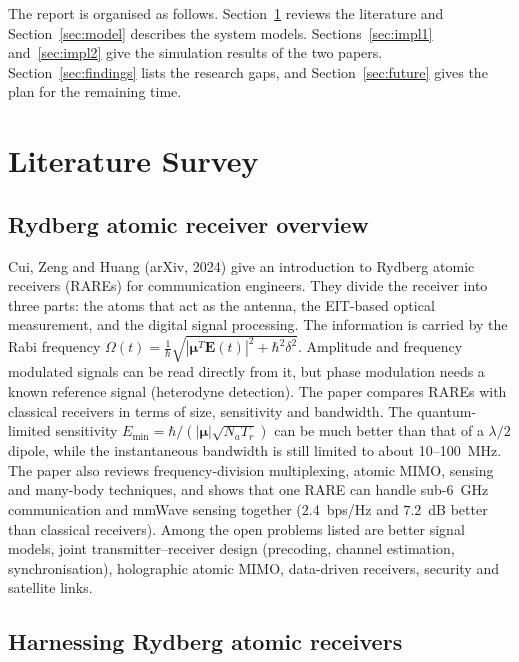 \documentclass[11pt,a4paper]{article}
\begin{document}
The report is organised as follows. Section~\ref{sec:lit} reviews the literature and
Section~\ref{sec:model} describes the system models. Sections~\ref{sec:impl1}
and~\ref{sec:impl2} give the simulation results of the two papers. Section~\ref{sec:findings}
lists the research gaps, and Section~\ref{sec:future} gives the plan
for the remaining time.


\section{Literature Survey}
\label{sec:lit}

\subsection{\texorpdfstring{Rydberg atomic receiver overview~\cite{cui2026rare}}{Rydberg atomic receiver overview}}

Cui, Zeng and Huang (arXiv, 2024) give an introduction to Rydberg atomic
receivers (RAREs) for communication engineers. They divide the receiver into three parts:
the atoms that act as the antenna, the EIT-based optical measurement, and the digital signal
processing. The information is carried by the Rabi frequency
$\Omega(t)=\frac{1}{\hbar}\sqrt{|\boldsymbol{\mu}^T\mathbf{E}(t)|^2+\hbar^2\delta^2}$. Amplitude
and frequency modulated signals can be read directly from it, but phase modulation needs a
known reference signal (heterodyne detection). The paper compares RAREs with classical
receivers in terms of size, sensitivity and bandwidth. The quantum-limited sensitivity
$E_{\min}=\hbar/(|\boldsymbol\mu|\sqrt{N_aT_r})$ can be much better than that of a $\lambda/2$
dipole, while the instantaneous bandwidth is still limited to about 10--100~MHz. The paper
also reviews frequency-division multiplexing, atomic MIMO, sensing and many-body techniques,
and shows that one RARE can handle sub-6~GHz communication and mmWave sensing together
($2.4$~bps/Hz and $7.2$~dB better than classical receivers). Among the open problems listed
are better signal models, joint transmitter--receiver design (precoding, channel estimation,
synchronisation), holographic atomic MIMO, data-driven receivers, security and satellite links.

\subsection{\texorpdfstring{Harnessing Rydberg atomic receivers~\cite{chen2025harnessing}}{Harnessing Rydberg atomic receivers}}
\end{document}
